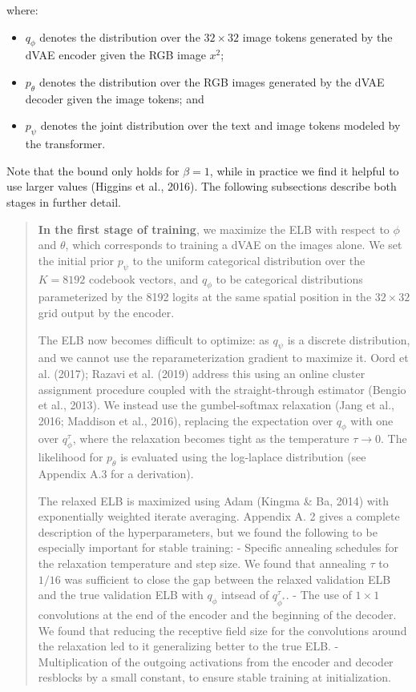 \documentclass{article}
\begin{document}
\begin{appendix}
{where:
\begin{itemize}
    \item $q_{\phi}$ denotes the distribution over the $32 \times 32$ image tokens generated by the dVAE encoder given the RGB image $x^{2}$;
    \item $p_{\theta}$ denotes the distribution over the RGB images generated by the dVAE decoder given the image tokens; and
    \item $p_{\psi}$ denotes the joint distribution over the text and image
tokens modeled by the transformer.
\end{itemize}
Note that the bound only holds for $\beta=1$, while in practice we find it helpful to use larger values (Higgins et al., 2016). The following subsections describe both stages in further detail.
}

\blockquote{\textbf{In the first stage of training}, we maximize the ELB with respect to $\phi$ and $\theta$, which corresponds to training a dVAE on the images alone. We set the initial prior $p_{\psi}$ to the uniform categorical distribution over the $K=8192$ codebook vectors, and $q_{\phi}$ to be categorical distributions parameterized by the 8192 logits at the same spatial position in the $32 \times 32$ grid output by the encoder.

The ELB now becomes difficult to optimize: as $q_{\psi}$ is a discrete distribution, and we cannot use the reparameterization gradient to maximize it. Oord et al. (2017); Razavi et al. (2019) address this using an online cluster assignment procedure coupled with the straight-through estimator (Bengio et al., 2013). We instead use the gumbel-softmax relaxation (Jang et al., 2016; Maddison et al., 2016), replacing the expectation over $q_{\phi}$ with one over $q_{\phi}^{\tau}$, where the relaxation becomes tight as the temperature $\tau \rightarrow 0$. The likelihood for $p_{\theta}$ is evaluated using the log-laplace distribution (see Appendix A.3 for a derivation).

The relaxed ELB is maximized using Adam (Kingma \& Ba, 2014) with exponentially weighted iterate averaging. Appendix A. 2 gives a complete description of the hyperparameters, but we found the following to be especially important for stable training:
- Specific annealing schedules for the relaxation temperature and step size. We found that annealing $\tau$ to $1 / 16$ was sufficient to close the gap between the relaxed validation ELB and the true validation ELB with $q_{\phi}$ intsead of $q_{\phi^{*}}^{\tau}$.
- The use of $1 \times 1$ convolutions at the end of the encoder and the beginning of the decoder. We found that reducing the receptive field size for the convolutions around the relaxation led to it generalizing better to the true ELB.
- Multiplication of the outgoing activations from the encoder and decoder resblocks by a small constant, to ensure stable training at initialization.

}
\end{appendix}
\end{document}
